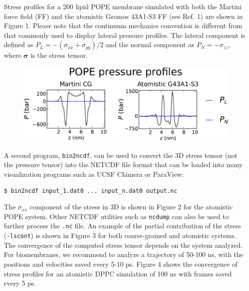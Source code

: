 \documentclass[10pt,letterpaper,notitlepage]{article}
\begin{document}
Stress profiles for a 200 lipid POPE membrane simulated with both the Martini force field (FF) and the atomistic Gromos 43A1-S3 FF (see Ref. 1) are shown in Figure 1. Please note that the continuum mechanics convention is different from that commonly used to display lateral pressure profiles. The lateral component is defined as $P_L=-(\sigma_{xx}+\sigma_{yy})/2$ and the normal component as $P_N=-\sigma_{zz}$, where $\bm{\sigma}$ is the stress tensor.

\begin{figure}[b]
\centering
\includegraphics[width=5.5in]{figs/tot.pdf}
\caption{}
\end{figure}

A second program, \texttt{bin2ncdf}, can be used to convert the 3D stress tensor (not the pressure tensor) into the NETCDF file format that can be loaded into many visualization programs such as UCSF Chimera or ParaView:
\begin{lstlisting}[caption=\texttt{bin2ncdf} usage]
$ bin2ncdf input_1.dat0 ... input_n.dat0 output.nc
\end{lstlisting}
The $\sigma_{xx}$ component of the stress in 3D is shown in Figure 2 for the atomistic POPE system. Other NETCDF utilities such as \texttt{ncdump} can also be used to further process the \texttt{.nc} file. An example of the partial contribution of the stress (\texttt{-lscont}) is shown in Figure 3 for both coarse-grained and atomistic systems. The convergence of the computed stress tensor depends on the system analyzed. For biomembranes, we recommend to analyze a trajectory of 50-100 ns, with the positions and velocities saved every 5-10 ps. Figure 4 shows the convergence of stress profiles for an atomistic DPPC simulation of 100 ns with frames saved every 5 ps.
\end{document}

